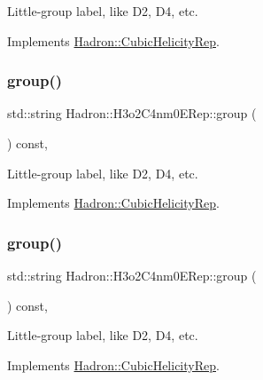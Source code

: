 Little-\/group label, like D2, D4, etc. 

Implements \mbox{\hyperlink{structHadron_1_1CubicHelicityRep_a101a7d76cd8ccdad0f272db44b766113}{Hadron\+::\+Cubic\+Helicity\+Rep}}.

\mbox{\label{structHadron_1_1H3o2C4nm0ERep_a2fe0c5a9224b4ed20f8e294547091975}} 
\subsubsection{\texorpdfstring{group()}{group()}\hspace{0.1cm}{\footnotesize\ttfamily [2/3]}}
{\footnotesize\ttfamily std\+::string Hadron\+::\+H3o2\+C4nm0\+E\+Rep\+::group (\begin{DoxyParamCaption}{ }\end{DoxyParamCaption}) const\hspace{0.3cm}{\ttfamily [inline]}, {\ttfamily [virtual]}}

Little-\/group label, like D2, D4, etc. 

Implements \mbox{\hyperlink{structHadron_1_1CubicHelicityRep_a101a7d76cd8ccdad0f272db44b766113}{Hadron\+::\+Cubic\+Helicity\+Rep}}.

\mbox{\label{structHadron_1_1H3o2C4nm0ERep_a2fe0c5a9224b4ed20f8e294547091975}} 
\subsubsection{\texorpdfstring{group()}{group()}\hspace{0.1cm}{\footnotesize\ttfamily [3/3]}}
{\footnotesize\ttfamily std\+::string Hadron\+::\+H3o2\+C4nm0\+E\+Rep\+::group (\begin{DoxyParamCaption}{ }\end{DoxyParamCaption}) const\hspace{0.3cm}{\ttfamily [inline]}, {\ttfamily [virtual]}}

Little-\/group label, like D2, D4, etc. 

Implements \mbox{\hyperlink{structHadron_1_1CubicHelicityRep_a101a7d76cd8ccdad0f272db44b766113}{Hadron\+::\+Cubic\+Helicity\+Rep}}.

